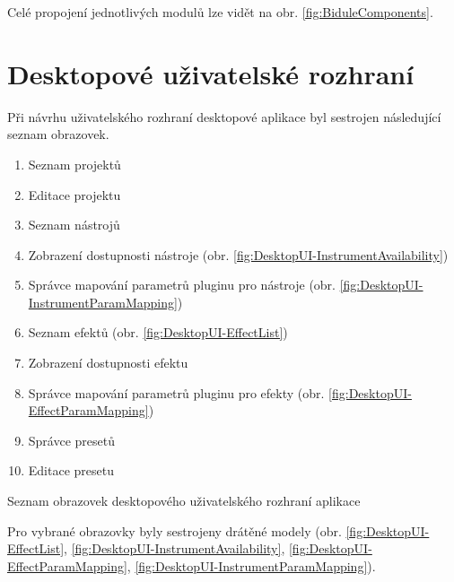 \documentclass[thesis=M,czech]{FITthesis}[2019/03/06]
\begin{document}
	Celé propojení jednotlivých modulů lze vidět na obr. \ref{fig:BiduleComponents}.
	
	\section{Desktopové uživatelské rozhraní}
	Při návrhu uživatelského rozhraní desktopové aplikace byl sestrojen následující seznam obrazovek.
	\begin{mylist}
		\begin{enumerate}[label=\textbf{D\arabic*.}]
			\item Seznam projektů
			\item Editace projektu
			\item Seznam nástrojů
			\item Zobrazení dostupnosti nástroje (obr. \ref{fig:DesktopUI-InstrumentAvailability})
			\item Správce mapování parametrů pluginu pro nástroje (obr. \ref{fig:DesktopUI-InstrumentParamMapping})
			\item Seznam efektů (obr. \ref{fig:DesktopUI-EffectList})
			\item Zobrazení dostupnosti efektu
			\item Správce mapování parametrů pluginu pro efekty	(obr. \ref{fig:DesktopUI-EffectParamMapping})		
			\item Správce presetů
			\item Editace presetu
		\end{enumerate}
		\caption{Seznam obrazovek desktopového uživatelského rozhraní aplikace}\label{list:DesktopUIScreen}		
	\end{mylist}
	
	Pro vybrané obrazovky byly sestrojeny drátěné modely 
	(obr. \ref{fig:DesktopUI-EffectList}, \ref{fig:DesktopUI-InstrumentAvailability}, 
	\ref{fig:DesktopUI-EffectParamMapping}, \ref{fig:DesktopUI-InstrumentParamMapping}).
	
\end{document}
